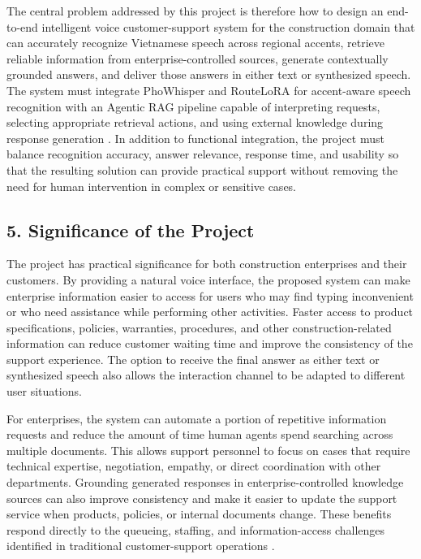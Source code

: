 \documentclass[11pt,a4paper]{article}
\begin{document}
The central problem addressed by this project is therefore how to design an
end-to-end intelligent voice customer-support system for the construction
domain that can accurately recognize Vietnamese speech across regional
accents, retrieve reliable information from enterprise-controlled sources,
generate contextually grounded answers, and deliver those answers in either
text or synthesized speech. The system must integrate PhoWhisper and RouteLoRA
for accent-aware speech recognition with an Agentic RAG pipeline capable of
interpreting requests, selecting appropriate retrieval actions, and using
external knowledge during response generation \cite{lewis2020,yao2023}. In
addition to functional integration, the project must balance recognition
accuracy, answer relevance, response time, and usability so that the resulting
solution can provide practical support without removing the need for human
intervention in complex or sensitive cases.

\subsection{5. Significance of the Project}

The project has practical significance for both construction enterprises and
their customers. By providing a natural voice interface, the proposed system
can make enterprise information easier to access for users who may find typing
inconvenient or who need assistance while performing other activities. Faster
access to product specifications, policies, warranties, procedures, and other
construction-related information can reduce customer waiting time and improve
the consistency of the support experience. The option to receive the final
answer as either text or synthesized speech also allows the interaction channel
to be adapted to different user situations.

For enterprises, the system can automate a portion of repetitive information
requests and reduce the amount of time human agents spend searching across
multiple documents. This allows support personnel to focus on cases that
require technical expertise, negotiation, empathy, or direct coordination with
other departments. Grounding generated responses in enterprise-controlled
knowledge sources can also improve consistency and make it easier to update the
support service when products, policies, or internal documents change. These
benefits respond directly to the queueing, staffing, and information-access
challenges identified in traditional customer-support operations
\cite{gans2003,nabavi2023}.
\end{document}
